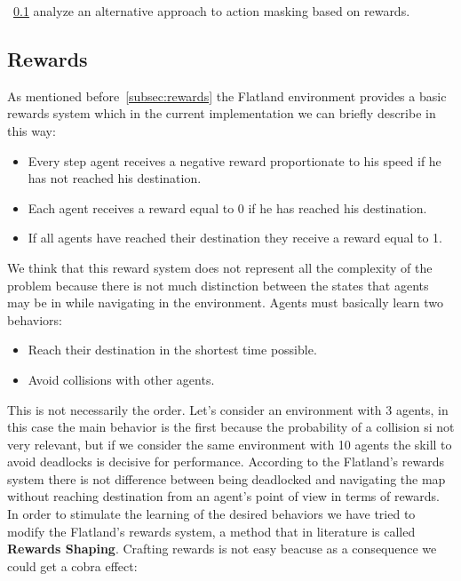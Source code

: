 \documentclass[11pt, a4paper, hidelinks]{report}
\begin{document}
~\ref{subsec:rewards2} analyze an alternative approach to action masking based on rewards.

\subsection{Rewards}\label{subsec:rewards2}

As mentioned before~\ref{subsec:rewards} the Flatland environment provides a basic rewards system which in the current implementation we can briefly describe in this way:
\begin{itemize}
	\item Every step agent receives a negative reward proportionate to his speed if he has not reached his destination.
	\item Each agent receives a reward equal to 0 if he has reached his destination.
	\item If all agents have reached their destination they receive a reward equal to 1.
\end{itemize}
We think that this reward system does not represent all the complexity of the problem because there is not much distinction between the states that agents may be in while navigating in the environment.
Agents must basically learn two behaviors:
\begin{itemize}
	\item Reach their destination in the shortest time possible.
	\item Avoid collisions with other agents.
\end{itemize}
This is not necessarily the order.
Let's consider an environment with 3 agents, in this case the main behavior is the first because the probability of a collision si not very relevant, but if we consider the same environment with 10 agents the skill to avoid deadlocks is decisive for performance.
According to the Flatland's rewards system there is not difference between being deadlocked and navigating the map without reaching destination from an agent's point of view in terms of rewards.
In order to stimulate the learning of the desired behaviors we have tried to modify the Flatland's rewards system, a method that in literature is called \textbf{Rewards Shaping}.
Crafting rewards is not easy beacuse as a consequence we could get a cobra effect:
\end{document}
